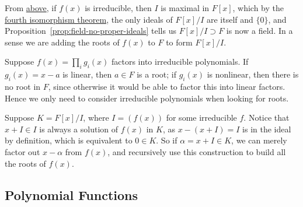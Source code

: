 \begin{remark}
    From \hyperref[thm:ideal-divisibility]{above},
    if \(f(x)\) is irreducible, then \(I\) is maximal in \(F[x]\),
    which by the \hyperref[thm:iso-4-ring]{fourth isomorphism theorem},
    the only ideals of \(F[x]/I\) are itself and \(\{0\}\),
    and Proposition~\ref{prop:field-no-proper-ideals}
    tells us \(F[x]/I \supset F\) is now a field.
    In a sense we are adding the roots of \(f(x)\) to \(F\) to form \(F[x]/I\).

    Suppose \(f(x) = \prod_i g_i(x)\) factors into irreducible polynomials.
    If \(g_i(x) = x-a\) is linear, then \(a \in F\) is a root;
    if \(g_i(x)\) is nonlinear, then there is no root in \(F\),
    since otherwise it would be able to factor this into linear factors.
    Hence we only need to consider irreducible polynomials
    when looking for roots.

    Suppose \(K = F[x]/I\), where \(I = (f(x))\) for some irreducible \(f\).
    Notice that \(x+I \in I\) is always a solution of \(f(x)\) in \(K\),
    as \(x-(x+I) = I\) is in the ideal by definition,
    which is equivalent to \(0 \in K\).
    So if \(\alpha = x+I \in K\),
    we can merely factor out \(x-\alpha\) from \(f(x)\),
    and recursively use this construction to build all the roots of \(f(x)\).
\end{remark}

\subsection*{Polynomial Functions}

